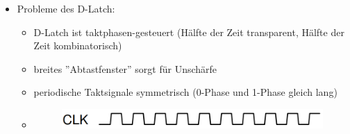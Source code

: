 \documentclass[11pt,a4paper]{article}
\begin{document}
\begin{itemize}
\begin{itemize}
	\item Probleme des D-Latch:
		\begin{itemize}
		\item D-Latch ist taktphasen-gesteuert (Hälfte der Zeit transparent, Hälfte der Zeit kombinatorisch)
		\item breites ''Abtastfenster'' sorgt für Unschärfe
		\item periodische Taktsignale symmetrisch (0-Phase und 1-Phase gleich lang)
		\item[] \begin{figure}[H]
				\begin{center}
				\includegraphics[height=0.75cm]{dlatch3}
				\end{center}
			\end{figure}
		\end{itemize}
	\end{itemize}

\end{itemize}
\end{document}

